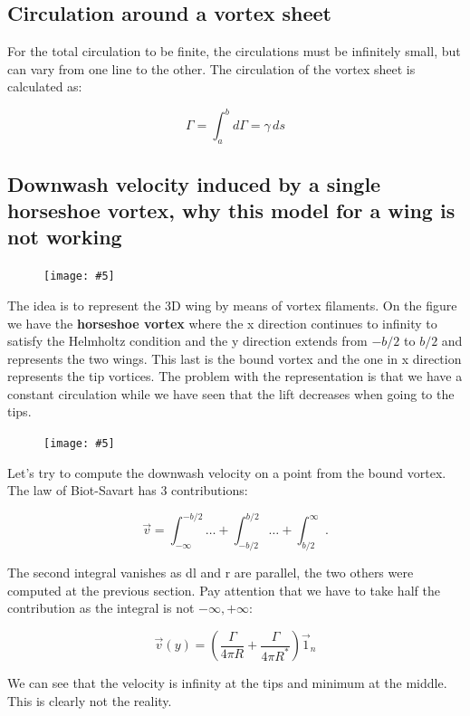 \documentclass[british,french,11pt, a4paper, openany]{article}
\newcommand{\wrapfig}[6]{%
	\begin{figure}%
		\vspace{-5mm}%
		\texttt{[image: \#5]}%
		\captionof{figure}{}%
		\label{#6}%
	\end{figure}%
}
\begin{document}
\subsection{Circulation around a vortex sheet}
 For the total circulation to be finite, the circulations must be infinitely small, but can vary from one line to the other. The circulation of the vortex sheet is calculated as:

\begin{equation}
\Gamma = \int _a ^b d\Gamma = \gamma \, ds
\end{equation}

\subsection{Downwash velocity induced by a single horseshoe vortex, why this model for a wing is not working}

\wrapfig{10}{l}{7}{0.08}{ch3/15}{fig:3.15}
The idea is to represent the 3D wing by means of vortex filaments. On the figure we have the \textbf{horseshoe vortex} where the x direction continues to infinity to satisfy the Helmholtz condition and the y direction extends from $-b/2$ to $b/2$ and represents the two wings. This last is the bound vortex and the one in x direction represents the tip vortices. The problem with the representation is that we have a constant circulation while we have seen that the lift decreases when going to the tips. 

\wrapfig{10}{r}{5}{0.1}{ch3/16}{fig:3.16}
Let's try to compute the downwash velocity on a point from the bound vortex. The law of Biot-Savart has 3 contributions: 

\begin{equation}
\vec{v} = \int _{-\infty} ^{-b/2} \dots + \int _{-b/2} ^{b/2} \dots + \int _{b/2}^{\infty}.
\end{equation}

The second integral vanishes as dl and r are parallel, the two others were computed at the previous section. Pay attention that we have to take half the contribution as the integral is not $-\infty,+\infty$:

\begin{equation}
\vec{v}(y) = \left(\frac{\Gamma}{4\pi R} + \frac{\Gamma}{4\pi R^*} \right) \vec{1}_n
\end{equation}

We can see that the velocity is infinity at the tips and minimum at the middle. This is clearly not the reality.
\end{document}
